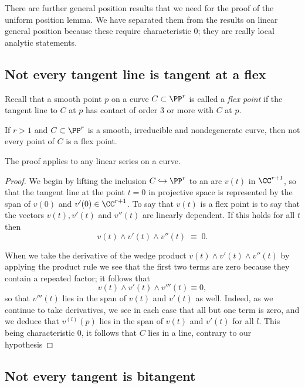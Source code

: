 There are  further general position results that we need for the proof of the uniform position lemma.  We have separated
them from the results on linear general position because these require characteristic 0; they are really local analytic
statements.


\subsection{Not every tangent line is tangent at a flex}\label{isolated tangents and bitangents}

Recall that a smooth point $p$ on a curve $C \subset \PP^r$ is called a \emph{flex point} if the tangent line to $C$ at  $p$ has contact of order 3 or more with $C$ at $p$.

\begin{lemma}\label{finite inflections}
If $r>1$ and $C \subset \PP^r$ is a smooth, irreducible and nondegenerate curve, then not every point of $C$ is a flex point.
\end{lemma}

The proof applies to any linear series on a curve.

\begin{proof}
We begin by lifting the inclusion $C \hookrightarrow \PP^r$ to an arc $v (t)$ in $\CC^{r+1}$, so that the tangent line at the point $t=0$ in projective space
is represented by the span of $v(0)$ and $v'(0) \in \CC^{r+1}$. To say that $v(t)$ is a flex point is to say that the  vectors $v(t), v'(t)$ and $v''(t)$ are linearly dependent. If this holds for all $t$ then
$$
v(t) \wedge  v'(t) \wedge v''(t) \; \equiv \; 0.
$$

When we take the derivative of the wedge product $v(t) \wedge v'(t) \wedge v''(t)$ by applying the product rule we see that the first two terms are zero because they contain a repeated factor; it follows that
$$
v(t) \wedge  v'(t) \wedge v'''(t) \equiv 0,
$$
so that $v'''(t)$ lies in the span of $v(t)$ and $v'(t)$ as well. Indeed, as we continue to take derivatives, we see in each case that all but one term is zero, and we deduce that $v^{(l)}(p)$ lies in the span of $v(t)$ and $v'(t)$ for all $l$. This being characteristic 0, it follows that $C$ lies in a line, contrary to our hypothesis
\end{proof}


 \subsection{Not every tangent is bitangent}
 
